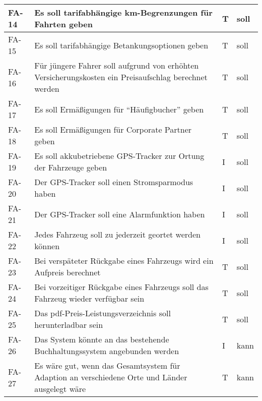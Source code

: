 \begin{longtable}{|m{2cm}|m{6.5cm}|P{2.5cm}|P{2.5cm}|}
        \hline
        FA-14           & Es soll tarifabhängige km-Begrenzungen für Fahrten geben & T & soll \\
        \hline
        FA-15           & Es soll tarifabhängige Betankungsoptionen geben & T & soll \\
        \hline
        FA-16           & Für jüngere Fahrer soll aufgrund von erhöhten Versicherungskosten ein Preisaufschlag berechnet werden &  T & soll \\
        \hline
        FA-17           & Es soll Ermäßigungen für \enquote{Häufigbucher} geben &  T & soll \\
        \hline
        FA-18           & Es soll Ermäßigungen für Corporate Partner geben &  T & soll \\
        \hline
        FA-19           & Es soll akkubetriebene GPS-Tracker zur Ortung der Fahrzeuge geben &  I & soll \\
        \hline
        FA-20           & Der GPS-Tracker soll einen Stromsparmodus haben & I & soll \\
        \hline
        FA-21           & Der GPS-Tracker soll eine Alarmfunktion haben & I & soll \\
        \hline
        FA-22           & Jedes Fahrzeug soll zu jederzeit geortet werden können &  I & soll \\
        \hline
        FA-23           & Bei verspäteter Rückgabe eines Fahrzeugs wird ein Aufpreis berechnet &  T & soll \\
        \hline
        FA-24           & Bei vorzeitiger Rückgabe eines Fahrzeugs soll das Fahrzeug wieder verfügbar sein & T & soll \\
        \hline
        FA-25           & Das pdf-Preis-Leistungsverzeichnis soll herunterladbar sein &  T & soll \\
        \hline
        FA-26           & Das System könnte an das bestehende Buchhaltungssystem angebunden werden &  I & kann \\
        \hline
        FA-27           & Es wäre gut, wenn das Gesamtsystem für Adaption an verschiedene Orte und Länder ausgelegt wäre &  T & kann \\
        \hline
    \end{longtable}\label{tab:Funktionale Anforderungen6}
%
